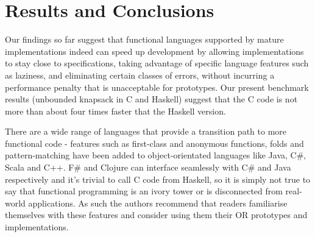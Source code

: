 \section{Results and Conclusions}

Our findings so far suggest that functional languages supported by mature
implementations indeed can speed up development by allowing implementations to
stay close to specifications, taking advantage of specific language features
such as laziness, and eliminating certain classes of errors, without incurring
a performance penalty that is unacceptable for prototypes. Our present
benchmark results (unbounded knapsack in C and Haskell) suggest that the C
code is not more than about four times faster that the Haskell version.

There are a wide range of languages that provide a transition path to more functional code - features such as first-class and anonymous functions, folds and pattern-matching have been added to object-orientated languages like Java, C\#, Scala and C++. F\# and Clojure can interface seamlessly with C\# and Java respectively and it's trivial to call C code from Haskell\cite{ffi}, so it is simply not true to say that functional programming is an ivory tower or is disconnected from real-world applications. As such the authors recommend that readers familiarise themselves with these features and consider using them their OR prototypes and implementations.
